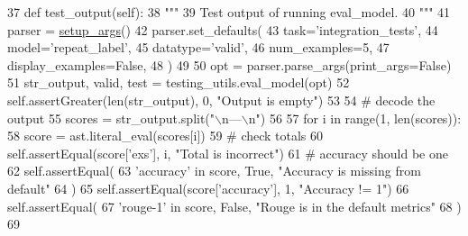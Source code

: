 \begin{DoxyCode}
37     \textcolor{keyword}{def }test\_output(self):
38         \textcolor{stringliteral}{"""}
39 \textcolor{stringliteral}{        Test output of running eval\_model.}
40 \textcolor{stringliteral}{        """}
41         parser = \hyperlink{namespaceparlai_1_1chat__service_1_1services_1_1browser__chat_1_1client_a20c9862417d1f1a61b06551de0820ee4}{setup\_args}()
42         parser.set\_defaults(
43             task=\textcolor{stringliteral}{'integration\_tests'},
44             model=\textcolor{stringliteral}{'repeat\_label'},
45             datatype=\textcolor{stringliteral}{'valid'},
46             num\_examples=5,
47             display\_examples=\textcolor{keyword}{False},
48         )
49 
50         opt = parser.parse\_args(print\_args=\textcolor{keyword}{False})
51         str\_output, valid, test = testing\_utils.eval\_model(opt)
52         self.assertGreater(len(str\_output), 0, \textcolor{stringliteral}{"Output is empty"})
53 
54         \textcolor{comment}{# decode the output}
55         scores = str\_output.split(\textcolor{stringliteral}{"\(\backslash\)n---\(\backslash\)n"})
56 
57         \textcolor{keywordflow}{for} i \textcolor{keywordflow}{in} range(1, len(scores)):
58             score = ast.literal\_eval(scores[i])
59             \textcolor{comment}{# check totals}
60             self.assertEqual(score[\textcolor{stringliteral}{'exs'}], i, \textcolor{stringliteral}{"Total is incorrect"})
61             \textcolor{comment}{# accuracy should be one}
62             self.assertEqual(
63                 \textcolor{stringliteral}{'accuracy'} \textcolor{keywordflow}{in} score, \textcolor{keyword}{True}, \textcolor{stringliteral}{"Accuracy is missing from default"}
64             )
65             self.assertEqual(score[\textcolor{stringliteral}{'accuracy'}], 1, \textcolor{stringliteral}{"Accuracy != 1"})
66             self.assertEqual(
67                 \textcolor{stringliteral}{'rouge-1'} \textcolor{keywordflow}{in} score, \textcolor{keyword}{False}, \textcolor{stringliteral}{"Rouge is in the default metrics"}
68             )
69 
\end{DoxyCode}
\mbox{\label{classtests_1_1test__eval__model_1_1TestEvalModel_a6f8c8d67ca1f6a036122e191fdc77c26}} 
